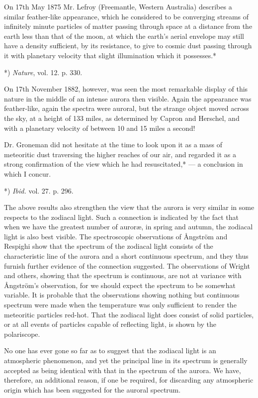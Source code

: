 \documentclass[a4paper, 12pt, oneside, polutonikogreek, english]{article}
\begin{document}
On 17th May 1875 Mr. Lefroy (Freemantle, Western Australia) describes a similar feather-like appearance, which he considered to be converging streams of infinitely minute particles of matter passing through space at a distance from the earth less than that of the moon, at which the earth's aerial envelope may still have a density sufficient, by its resistance, to give to cosmic dust passing through it with planetary velocity that slight illumination which it possesses.*

*) \emph{Nature}, vol. 12. p. 330.

On 17th November 1882, however, was seen the most remarkable display of this nature in the middle of an intense aurora then visible. Again the appearance was feather-like, again the spectra were auroral, but the strange object moved across the sky, at a height of 133 miles, as determined by Capron and Herschel, and with a planetary velocity of between 10 and 15 miles a second!

Dr. Groneman did not hesitate at the time to look upon it as a mass of meteoritic dust traversing the higher reaches of our air, and regarded it as a strong confirmation of the view which he had resuscitated,* --- a conclusion in which I concur.

*) \emph{Ibid.} vol. 27. p. 296.

The above results also strengthen the view that the aurora is very similar in some respects to the zodiacal light. Such a connection is indicated by the fact that when we have the greatest number of auroræ, in spring and autumn, the zodiacal light is also best visible. The spectroscopic observations of Ångström and Respighi show that the spectrum of the zodiacal light consists of the characteristic line of the aurora and a short continuous spectrum, and they thus furnish further evidence of the connection suggested. The observations of Wright and others, showing that the spectrum is continuous, are not at variance with Ångström's observation, for we should expect the spectrum to be somewhat variable. It is probable that the observations showing nothing but continuous spectrum were made when the temperature was only sufficient to render the meteoritic particles red-hot. That the zodiacal light does consist of solid particles, or at all events of particles capable of reflecting light, is shown by the polariscope.

No one has ever gone so far as to suggest that the zodiacal light is an atmospheric phenomenon, and yet the principal line in its spectrum is generally accepted as being identical with that in the spectrum of the aurora. We have, therefore, an additional reason, if one be required, for discarding any atmospheric origin which has been suggested for the auroral spectrum.
\end{document}
